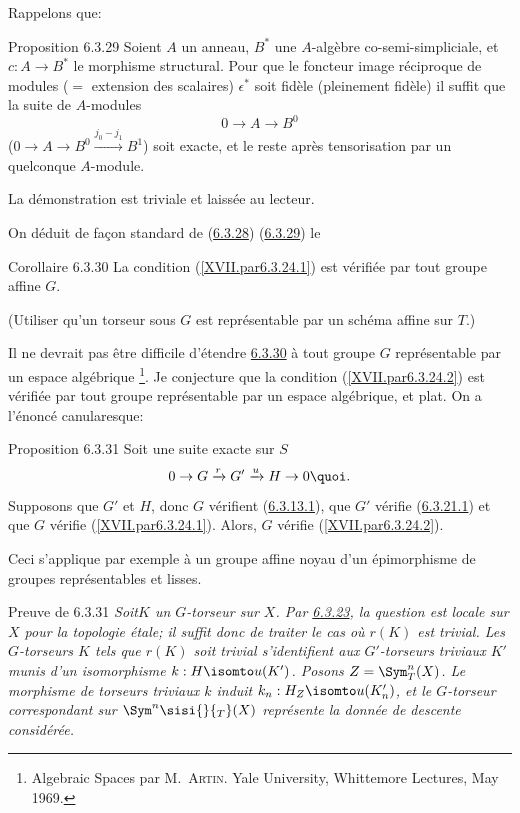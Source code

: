 \documentclass[10pt]{../fichiers-configuration-latex/smfart}
\begin{document}
Rappelons que:

\begin{enonce*}{Proposition 6.3.29}
Soient $A$ un anneau, $B^{\ast}$ une $A$-algèbre co-semi-simpliciale,
et $c:A\rightarrow B^{\ast}$ le morphisme structural. Pour que le
foncteur image réciproque de modules ($=$ extension des scalaires)
$\epsilon^{\ast}$ soit fidèle (\resp pleinement fidèle) il suffit que
la suite de $A$-modules
$$
0\longrightarrow A\longrightarrow B^{0}
$$
(\resp\pageoriginale $0\rightarrow A\rightarrow
B^{0}\xrightarrow{j_{0}-j_{1}}B^{1}$)
soit exacte, et le reste après tensorisation par un quelconque $A$-module.
\end{enonce*}

La démonstration est triviale et laissée au lecteur.

On déduit de façon standard de (\hyperref[XVII.prop6.3.28]{6.3.28}) (\hyperref[XVII.prop6.3.29]{6.3.29}) le

\begin{enonce*}{Corollaire 6.3.30}
La condition (\ref{XVII.par6.3.24.1}) est vérifiée par tout groupe affine $G$.
\end{enonce*}

(Utiliser qu'un torseur sous $G$ est représentable par un schéma
affine sur $T$.)

Il ne devrait pas être difficile d'étendre \hyperref[XVII.cor6.3.30]{6.3.30} à tout groupe $G$
représentable par un espace algébrique \footnote[1]{\label{XVII.noteArtin2}Algebraic Spaces
par M.~\textsc{Artin}. Yale University, Whittemore Lectures, May 1969.}. Je
conjecture que la condition (\ref{XVII.par6.3.24.2}) est vérifiée par tout groupe
représentable par un espace algébrique, et plat. On a l'énoncé
canularesque:

\begin{enonce*}{Proposition 6.3.31}
Soit une suite exacte sur $S$
$$
0\rightarrow G\xrightarrow{r}G'\xrightarrow{u}H\rightarrow 0{\quoi}.
$$ Supposons que $G'$ et $H$, donc $G$ vérifient
(\hyperref[XVII.par6.3.13.1]{6.3.13.1}), que $G'$ vérifie (\hyperref[XVII.par6.3.21.1]{6.3.21.1}) et
que $G$ vérifie (\ref{XVII.par6.3.24.1}). Alors, $G$ vérifie
(\ref{XVII.par6.3.24.2}).
\end{enonce*}

Ceci s'applique par exemple à un groupe affine noyau d'un épimorphisme
de groupes représentables et lisses.

\begin{enonce*}{Preuve de 6.3.31}
\emph{Soit\pageoriginale $K$ un $G$-torseur sur
$X$. Par \hyperref[XVII.prop6.3.23]{6.3.23}, la question est locale sur $X$ pour la topologie
étale; il suffit donc de traiter le cas où $r(K)$ est trivial. Les
$G$-torseurs $K$ tels que $r(K)$ soit trivial s'identifient aux
$G'$-torseurs triviaux $K'$ munis d'un isomorphisme
$k:H\isomto u(K')$. Posons $Z=\Sym^{n}_{T}(X)$. Le morphisme
de torseurs triviaux $k$ induit $k_{n}:H_{Z}\isomto
u(K'_{n})$, et le $G$-torseur correspondant sur $\Sym^{n}\sisi{}{_T}(X)$
représente la donnée de descente considérée.}
\end{enonce*}
\end{document}
